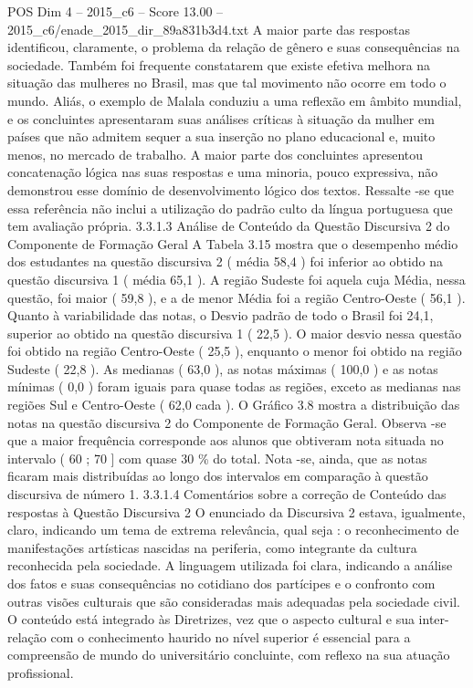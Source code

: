 \begin{textsample}{POS Dim 4 – 2015\_c6 – Score 13.00 – 2015\_c6/enade\_2015\_dir\_89a831b3d4.txt}
A maior parte das respostas identificou, claramente, o problema da relação de gênero e suas consequências na sociedade.
Também foi frequente constatarem que existe efetiva melhora na situação das mulheres no Brasil, mas que tal movimento não ocorre em todo o mundo.
Aliás, o exemplo de Malala conduziu a uma reflexão em âmbito mundial, e os concluintes apresentaram suas análises críticas à situação da mulher em países que não admitem sequer a sua inserção no plano educacional e, muito menos, no mercado de trabalho.
A maior parte dos concluintes apresentou concatenação lógica nas suas respostas e uma minoria, pouco expressiva, não demonstrou esse domínio de desenvolvimento lógico dos textos.
Ressalte -se que essa referência não inclui a utilização do padrão culto da língua portuguesa que tem avaliação própria. 3.3.1.3 Análise de Conteúdo da Questão Discursiva 2 do Componente de Formação Geral A Tabela 3.15 mostra que o desempenho médio dos estudantes na questão discursiva 2 ( média 58,4 ) foi inferior ao obtido na questão discursiva 1 ( média 65,1 ).
A região Sudeste foi aquela cuja Média, nessa questão, foi maior ( 59,8 ), e a de menor Média foi a região Centro-Oeste ( 56,1 ).
Quanto à variabilidade das notas, o Desvio padrão de todo o Brasil foi 24,1, superior ao obtido na questão discursiva 1 ( 22,5 ).
O maior desvio nessa questão foi obtido na região Centro-Oeste ( 25,5 ), enquanto o menor foi obtido na região Sudeste ( 22,8 ).
As medianas ( 63,0 ), as notas máximas ( 100,0 ) e as notas mínimas ( 0,0 ) foram iguais para quase todas as regiões, exceto as medianas nas regiões Sul e Centro-Oeste ( 62,0 cada ).
O Gráfico 3.8 mostra a distribuição das notas na questão discursiva 2 do Componente de Formação Geral.
Observa -se que a maior frequência corresponde aos alunos que obtiveram nota situada no intervalo ( 60 ; 70 ] com quase 30 \% do total.
Nota -se, ainda, que as notas ficaram mais distribuídas ao longo dos intervalos em comparação à questão discursiva de número 1. 3.3.1.4 Comentários sobre a correção de Conteúdo das respostas à Questão Discursiva 2 O enunciado da Discursiva 2 estava, igualmente, claro, indicando um tema de extrema relevância, qual seja : o reconhecimento de manifestações artísticas nascidas na periferia, como integrante da cultura reconhecida pela sociedade.
A linguagem utilizada foi clara, indicando a análise dos fatos e suas consequências no cotidiano dos partícipes e o confronto com outras visões culturais que são consideradas mais adequadas pela sociedade civil.
O conteúdo está integrado às Diretrizes, vez que o aspecto cultural e sua inter-relação com o conhecimento haurido no nível superior é essencial para a compreensão de mundo do universitário concluinte, com reflexo na sua atuação profissional.

\end{textsample}
